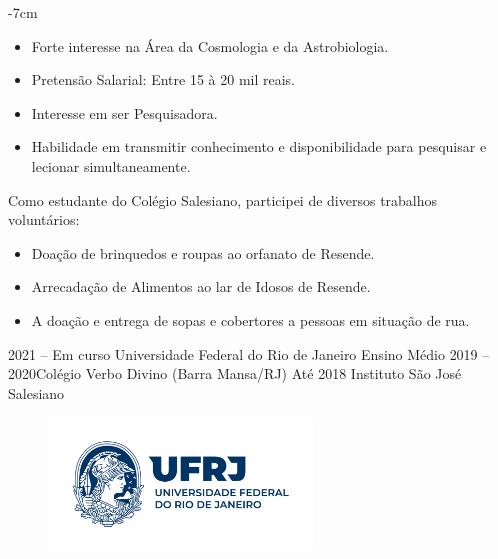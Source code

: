 \documentclass[10pt,a4paper]{altacv}
\begin{document}



\begin{adjustwidth}{}{-7cm}
\makecvheader
\end{adjustwidth}


\begin{itemize}
\item Forte interesse na Área da Cosmologia e da Astrobiologia.
\item Pretensão Salarial: Entre 15 à 20 mil reais.
\item Interesse em ser Pesquisadora.
\item Habilidade em transmitir conhecimento e disponibilidade para pesquisar e lecionar simultaneamente.
\end{itemize}
\bigskip


{Como estudante do Colégio Salesiano, participei de diversos trabalhos voluntários:}


\begin{itemize}
\item  Doação de brinquedos e roupas ao orfanato de Resende. \\     \item Arrecadação de Alimentos ao lar de Idosos de Resende.\\
\item A doação e entrega de sopas e cobertores a pessoas em situação de rua.\\
\end{itemize}
\bigskip



{2021 -- Em curso} {Universidade Federal do Rio de Janeiro}
\cvevent{} {Ensino Médio}
{2019 -- 2020}{Colégio Verbo Divino (Barra Mansa/RJ)}
{ Até 2018 }{Instituto São José Salesiano }


\begin{figure}[h]
    \centering
    \includegraphics[width=7cm]{ufrjisa.png}
    \label{fig:enter-label}
\end{figure}
\end{document}
